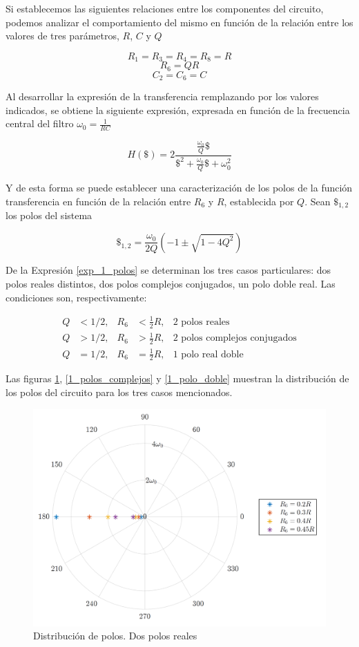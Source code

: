 Si establecemos las siguientes relaciones entre los componentes del circuito, podemos analizar el comportamiento del mismo en función de la relación entre los valores de tres parámetros, $R$, $C$ y $Q$


\[R_1=R_3=R_4=R_8 = R \]
\[R_6 = QR\] 
\[C_2=C_6=C\]

Al desarrollar la expresión de la transferencia remplazando por los valores indicados, se obtiene la siguiente expresión, expresada en función de la frecuencia central del filtro $\omega_0 = \frac{1}{RC}$

\[
H(\$) = 2 \frac{\frac{\omega_0}{Q}\$}{\$^2 + \frac{\omega_0}{Q}\$ + \omega_0^2}
\]

Y de esta forma se puede establecer una caracterización de los polos de la función transferencia en función de la relación entre $R_6$ y $R$, establecida por $Q$. Sean $\$_{1,2}$ los polos del sistema

\begin{equation}
\$_{1,2} = \frac{\omega_0}{2Q}\left(-1 \pm \sqrt{1-4Q^2}\right)
\label{exp_1_polos}
\end{equation}

De la Expresión \ref{exp_1_polos} se determinan los tres casos particulares: dos polos reales distintos, dos polos complejos conjugados, un polo doble real. Las condiciones son, respectivamente:

\begin{subequations}
\begin{align*}
  Q &< 1/2, & R_6 &< \frac{1}{2} R, &\text{2 polos reales} \\
  Q &> 1/2, & R_6 &> \frac{1}{2} R, &\text{2 polos complejos conjugados} \\
  Q &= 1/2, & R_6 &= \frac{1}{2} R, &\text{1 polo real doble}
\end{align*}
\end{subequations}

Las figuras \ref{1_polos_reales}, \ref{1_polos_complejos} y \ref{1_polo_doble} muestran la distribución de los polos del circuito para los tres casos mencionados.

\begin{figure}[ht]
\centering
\includegraphics[scale=0.5]{resources/1_polos_reales}
\caption{Distribución de polos. Dos polos reales}
\label{1_polos_reales}
\end{figure}

